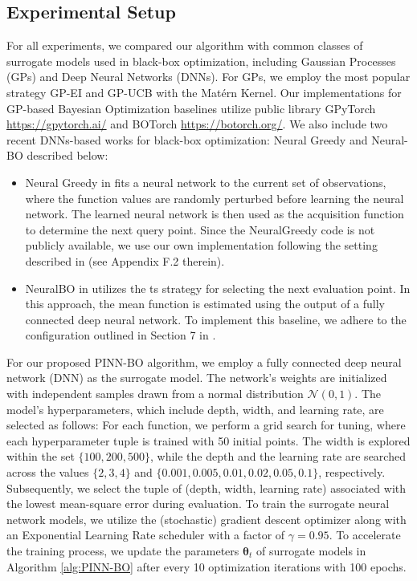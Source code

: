 \subsection{Experimental Setup}
\label{section:pinn-bo_baselines}
For all experiments, we compared our algorithm with common classes of surrogate models used in black-box optimization, including Gaussian Processes (GPs) and Deep Neural Networks (DNNs). For GPs, we employ the most popular strategy GP-EI \citep{mockus1978application} and GP-UCB \citep{srinivas2009gaussian} with the Mat\'ern Kernel. Our implementations for GP-based Bayesian Optimization baselines utilize public library GPyTorch  \url{https://gpytorch.ai/} and BOTorch \url{https://botorch.org/}. We also include two recent DNNs-based works for black-box optimization: Neural Greedy \citep{pariagreedy} and Neural-BO \citep{phan2023neuralbo} described below:
\begin{itemize}
    \item Neural Greedy in \citet{pariagreedy} fits a neural network to the current set of observations, where the function values are randomly perturbed before learning the neural network. The learned neural network is then used as the acquisition function to determine the next query point. Since the NeuralGreedy code is not publicly available, we use our own implementation following the setting described in     \citet{pariagreedy} (see Appendix F.2 therein).
    \item NeuralBO in \citet{phan2023neuralbo} utilizes the \acl{ts} strategy for selecting the next evaluation point. In this approach, the mean function is estimated using the output of a fully connected deep neural network. To implement this baseline, we adhere to the configuration outlined in Section 7 in \citet{phan2023neuralbo}.
\end{itemize}
For our proposed PINN-BO algorithm, we employ a fully connected deep neural network (DNN) as the surrogate model. The network's weights are initialized with independent samples drawn from a normal distribution $\mathcal{N} (0, 1)$. The model's hyperparameters, which include depth, width, and learning rate, are selected as follows: For each function, we perform a grid search for tuning, where each hyperparameter tuple is trained with 50 initial points. The width is explored within the set $\{100,200,500\}$, while the depth and the learning rate are searched across the values $\{2,3,4\}$ and $\{0.001, 0.005, 0.01, 0.02, 0.05, 0.1\}$, respectively.  Subsequently, we select the tuple of (depth, width, learning rate) associated with the lowest mean-square error during evaluation. To train the surrogate neural network models, we utilize the (stochastic) gradient descent optimizer along with an Exponential Learning Rate scheduler with a factor of $\gamma=0.95$. To accelerate the training process, we update the parameters $\boldsymbol{\theta}_t$ of surrogate models in Algorithm \ref{alg:PINN-BO} after every 10 optimization iterations with 100 epochs.  

